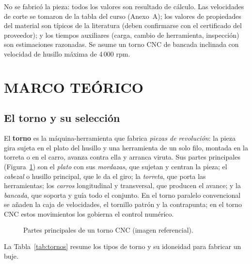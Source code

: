 \documentclass[12pt,a4paper]{article}
\begin{document}
\begin{nota}
	No se fabricó la pieza: todos los valores son resultado de cálculo.
	Las velocidades de corte se tomaron de la tabla del curso (Anexo~A); los
	valores de propiedades del material son típicos de la literatura (deben
	confirmarse con el certificado del proveedor); y los tiempos auxiliares
	(carga, cambio de herramienta, inspección) son estimaciones razonadas. Se
	asume un torno CNC de bancada inclinada con velocidad de husillo máxima de
	4\,000 rpm.
\end{nota}

\section{MARCO TEÓRICO}

\subsection{El torno y su selección}

El \textbf{torno} es la máquina-herramienta que fabrica \emph{piezas de
	revolución}: la pieza gira sujeta en el plato del husillo y una herramienta de
un solo filo, montada en la torreta o en el carro, avanza contra ella y arranca
viruta. Sus partes principales (Figura~\ref{fig:partes}) son el \emph{plato} con
sus \emph{mordazas}, que sujetan y centran la pieza; el \emph{cabezal} o husillo
principal, que le da el giro; la \emph{torreta}, que porta las herramientas; los
\emph{carros} longitudinal y transversal, que producen el avance; y la
\emph{bancada}, que soporta y guía todo el conjunto. En el torno paralelo
convencional se añaden la caja de velocidades, el tornillo patrón y la
contrapunta; en el torno CNC estos movimientos los gobierna el control numérico.

\begin{figure}[H]
	\centering
	\caption{Partes principales de un torno CNC (imagen referencial).}\label{fig:partes}
\end{figure}

La Tabla~\ref{tab:tornos} resume los tipos de torno y su idoneidad para fabricar
un buje.
\end{document}
